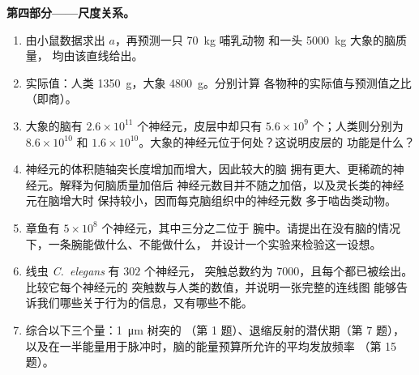 \begin{problem}
\medskip
\noindent\textbf{第四部分——尺度关系。}
\begin{enumerate}[resume]
  \item 由小鼠数据求出 $a$，再预测一只 \qty{70}{kg} 哺乳动物
        和一头 \qty{5000}{kg} 大象的脑质量，
        均由该直线给出。
  \item 实际值：人类 \qty{1350}{g}，大象 \qty{4800}{g}。分别计算
        各物种的实际值与预测值之比
        （即商）。
  \item 大象的脑有 $2.6\times 10^{11}$ 个神经元，皮层中却只有
        $5.6\times 10^{9}$ 个；人类则分别为 $8.6\times 10^{10}$
        和 $1.6\times 10^{10}$。大象的神经元位于何处？这说明皮层的
        功能是什么？
  \item 神经元的体积随轴突长度增加而增大，因此较大的脑
        拥有更大、更稀疏的神经元。解释为何脑质量加倍后
        神经元数目并不随之加倍，以及灵长类的神经元在脑增大时
        保持较小，因而每克脑组织中的神经元数
        多于啮齿类动物。
  \item 章鱼有 $5\times 10^{8}$ 个神经元，其中三分之二位于
        腕中。请提出在没有脑的情况下，一条腕能做什么、不能做什么，
        并设计一个实验来检验这一设想。
  \item 线虫 \emph{C.~elegans} 有 $302$ 个神经元，
        突触总数约为 \num{7000}，且每个都已被绘出。比较它每个神经元的
        突触数与人类的数值，并说明一张完整的连线图
        能够告诉我们哪些关于行为的信息，又有哪些不能。
  \item 综合以下三个量：\qty{1}{\micro m} 树突的
        （第 1 题）、退缩反射的潜伏期（第 7 题），
        以及在一半能量用于脉冲时，脑的能量预算所允许的平均发放频率
        （第 15 题）。
\end{enumerate}
\end{problem}
